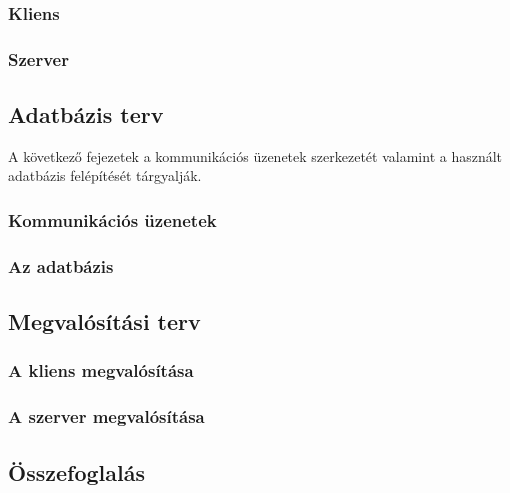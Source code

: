 \subsubsection{Kliens}
\label{sec:kliensinterfesz}

\subsubsection{Szerver}
\label{sec:szerverinterfesz}

\subsection{Adatbázis terv}

A következő fejezetek a kommunikációs üzenetek szerkezetét valamint a használt adatbázis felépítését tárgyalják.


\subsubsection{Kommunikációs üzenetek}
\label{sec:kommuzenetek}

\subsubsection{Az adatbázis}
\label{sec:adatb}

\subsection{Megvalósítási terv}
\label{sec:megvalositas}

\subsubsection{A kliens megvalósítása}

\subsubsection{A szerver megvalósítása}
\label{sec:szervermegvalositas}


\subsection{Összefoglalás}

